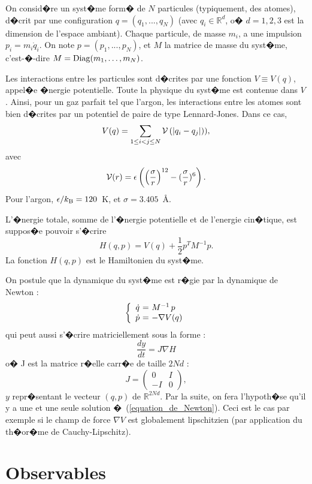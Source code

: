 \documentclass[a4paper,10pt,twoside]{report}
\begin{document}
On consid�re un syst�me form� de $N$ particules (typiquement, des
atomes), d�crit par une configuration $q=(q_{1},...,q_{N})$ (avec $q_i
\in \mathbb{R}^d$, o� $d=1,2,3$ est la dimension de l'espace
ambiant). Chaque particule, de masse $m_i$, a une impulsion $p_i = m_i
\dot{q}_i$. On note $p=(p_{1},...,p_{N})$, et $M$ la matrice de masse
du syst�me, c'est-�-dire $M = {\rm Diag}(m_1,\dots,m_N)$.

Les interactions entre les particules sont d�crites par une fonction
$V \equiv V(q)$, appel�e �nergie potentielle. Toute la physique du
syst�me est contenue dans $V$. Ainsi, pour un gaz parfait tel que
l'argon, les interactions entre les atomes sont bien d�crites par un
potentiel de paire de type Lennard-Jones. Dans ce cas,
\[
V(q) = \sum_{1 \leq i < j \leq N} {\cal V}\left(|q_i-q_j| \right)), 
\]
avec 
\[
{\cal V}(r) = \epsilon \left ( \left(\frac{\sigma}{r}\right)^{12} - (\frac{\sigma}{r})^{6}\right ).
\]
Pour l'argon, $\epsilon/k_{\rm B} = 120$~K, et $\sigma = 3.405$~\AA.

L'�nergie totale, somme de l'�nergie potentielle et de l'energie cin�tique, est suppos�e pouvoir s'�crire
\[
\label{hamiltonien}
H(q,p) = V(q) + \frac12 p^T M^{-1} p.
\]
La fonction $H(q,p)$ est le Hamiltonien du syst�me.

On postule que la dynamique du syst�me est r�gie par la dynamique de Newton : 
\begin {equation}
\label{equation_de_Newton}
\left \{ 
\begin{array}{c@{ \ = \ }l}
\dot{q} & M^{-1} \, p \\
\dot{p} & - \nabla V(q)  \\
\end{array} \right.
\end{equation}
qui peut aussi s'�crire matriciellement sous la forme :
\[
\frac{dy}{dt} = J\nabla H
\]
o� J est la matrice r�elle carr�e de taille $2Nd$ :
\[
J = \begin{pmatrix}
  0 & I  \\
  -I & 0
\end{pmatrix},
\]
$y$ repr�sentant le vecteur $(q,p)$ de $\mathbb{R}^{2Nd}$.
 Par la suite, on fera l'hypoth�se qu'il y a une et une seule solution
�~(\ref{equation_de_Newton}). Ceci est le cas par exemple si le champ
de force $\nabla V$ est globalement lipschitzien (par application du
th�or�me de Cauchy-Lipschitz).

\section{Observables}
\end{document}
